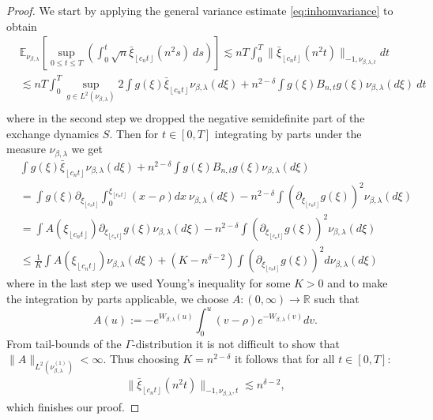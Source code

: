\documentclass[a4paper, reqno, 12pt]{amsart}
\theoremstyle{plain}
\theoremstyle{definition}
\newcommand{\floor}[1]{\left\lfloor #1 \right\rfloor}
\newcommand{\parent}[1]{\left( #1 \right)}
\newcommand{\ee}[1]{\mathbb{E}_{\nu_{\beta,\lambda}}\left[ #1 \right]}
\newcommand{\R}{\mathbb{R}}
\begin{document}
\begin{proof}
    We start by applying the general variance estimate \eqref{eq:inhomvariance} to obtain
    \begin{equation*}
    \begin{split}
    &\ee{\sup_{0\leq t\leq T} \parent{\int_0^t \sqrt{n}{\bar\xi_{\floor{c_nt}}(n^2 s)} \ ds}} \lesssim nT \int_0^T \| \bar{\xi}_{\floor{c_nt}} (n^2t)\|_{-1,\nu_{\beta,\lambda, t}} dt \\
    &\lesssim nT \int_0^T\sup_{g\in L^2(\nu_{\beta,\lambda})} 2\int g(\xi)\bar{\xi}_{\floor{c_nt}} \nu_{\beta,\lambda}(d\xi) + n^{2-\delta} \int g(\xi)  B_{n,t} g(\xi) \nu_{\beta,\lambda}(d\xi) \ dt \\
    \end{split}
    \end{equation*}
    where in the second step we dropped the negative semidefinite part of the exchange dynamics $S$.
    Then for $t\in[0,T]$ integrating by parts under  the measure  $\nu_{\beta,\lambda}$ we get
    \begin{align*}
        & \int g(\xi)\bar{\xi}_{\floor{c_nt}} \nu_{\beta,\lambda}(d\xi)+ n^{2-\delta} \int g(\xi)  B_{n,t} g(\xi) \nu_{\beta,\lambda}(d\xi) \\ 
        & = \int g(\xi)\partial_{\xi_{\floor{c_nt}}}\int_0^
        {\xi_{\floor{c_nt}}}(x-\rho) dx \ \nu_{\beta,\lambda}(d\xi)  - n^{2-\delta} \int  (\partial_{\xi_{\floor{c_nt}}} g(\xi))^2 \nu_{\beta,\lambda}(d\xi)  \\
        & = \int A(\xi_{\floor{c_nt}}) \partial_{\xi_{\floor{c_nt}}}g(\xi) \nu_{\beta,\lambda}(d\xi) - n^{2-\delta} \int  (\partial_{\xi_{\floor{c_nt}}} g(\xi))^2 \nu_{\beta,\lambda}(d\xi)\\
        &\leq \frac{1}{K}\int A(\xi_{\floor{c_nt}}) \nu_{\beta,\lambda}(d\xi) + (K-n^{\delta-2})\int (\partial_{\xi_{\floor{c_nt}}} g(\xi))^2 d\nu_{\beta,\lambda}(d\xi)
    \end{align*}
    where in the last step we used Young's inequality for some $K>0$ and to make the integration by parts applicable,  we choose $A:(0,\infty)\to \R$ such that
    \begin{equation*}
        A(u):= -e^{W_{\beta,\lambda}(u)} \int_0^{u} (v-\rho)e^{-W_{\beta,\lambda}(v)} dv.
    \end{equation*}
    From tail-bounds of the $\Gamma$-distribution it is not difficult to show that $\|A\|_{L^2(\nu_{\beta,\lambda}^{(1)})}< \infty$. Thus choosing $K = n^{2-\delta}$ it follows that for all $t\in[0,T]$:
    \begin{align*}
        \|\bar\xi_{\floor{c_nt}}(n^2t)\|_{-1,\nu_{\beta,\lambda},t} \lesssim n^{\delta-2}, 
    \end{align*}
    which finishes our proof.
\end{proof}
\end{document}
